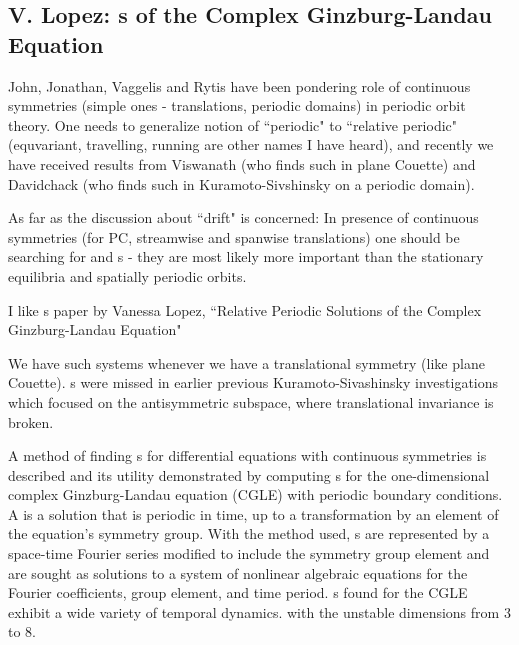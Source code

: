 \subsection{V. Lopez: 
	    {\Rpo s} of the Complex Ginzburg-Landau Equation}

        John, Jonathan, Vaggelis and Rytis have been pondering role of
continuous symmetries (simple ones - translations, periodic domains) in
periodic orbit theory. One needs to
generalize notion of ``periodic" to ``relative periodic" (equvariant,
travelling, running are other names I have heard), and recently
we have received results from Viswanath (who finds such in plane Couette)
and Davidchack (who finds such in Kuramoto-Sivshinsky on a periodic
domain).

As far as the discussion about ``drift" is concerned:
In presence of continuous symmetries (for PC, streamwise and
spanwise translations) one should be searching for 
{\reqva} and 
{\rpo s} - they are most likely more important than
the stationary equilibria and spatially periodic orbits. 

I like {\rpo s} paper by
Vanessa Lopez,
``Relative Periodic Solutions of the Complex Ginzburg-Landau Equation" 
     
We have such systems whenever we have a translational symmetry (like plane
Couette).
{\Rpo s} were missed in earlier 
previous Kuramoto-Sivashinsky investigations%
which focused on the antisymmetric subspace, where translational invariance
is broken.

     
A method of finding {\rpo s} for differential equations with 
continuous symmetries is described and its utility demonstrated by computing 
{\rpo s} for the one-dimensional complex Ginzburg-Landau 
equation (CGLE) with periodic boundary conditions.  A {\rpo} is 
a solution that is periodic in time, up to a transformation by an element of the 
equation's symmetry group.  With the method used, {\rpo s} are 
represented by a space-time Fourier series modified to include the symmetry 
group element and are sought as solutions to a system of nonlinear algebraic 
equations for the Fourier coefficients, group element, and time period. 
{\Rpo s} found for the CGLE exhibit a wide variety of temporal 
dynamics.
with the %
unstable dimensions from 3 to 8.

